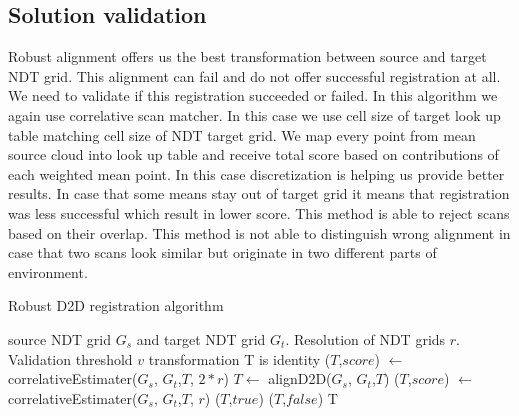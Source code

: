 \subsection{Solution validation}
Robust alignment offers us the best transformation between source and target \gls{NDT} grid. This alignment can fail and do not offer successful registration at all. We need to validate if this registration succeeded or failed. In this algorithm we again use correlative scan matcher. In this case we use cell size of target look up table matching cell size of \gls{NDT} target grid. We map every point from mean source cloud into look up table and receive total score based on contributions of each weighted mean point. In this case discretization is helping us provide better results. In case that some means stay out of target grid it means that registration was less successful which result in lower score. This method is able to reject scans based on their overlap. This method is not able to distinguish wrong alignment in case that two scans look similar but originate in two different parts of environment.

\begin{algorithm}
\label{alg:robust_d2d}
    \caption{Robust \gls{D2D} registration algorithm}
\begin{algorithmic}[1]
\Require source \gls{NDT} grid $G_{s}$ and target \gls{NDT} grid $G_{t}$. Resolution of \gls{NDT} grids $r$. Validation threshold $v$
 \State transformation T is identity
 \State ($T$,$score$) $\gets$ correlativeEstimater($G_{s}$, $G_{t}$,$T$, $2*r$)
 \State $T \gets$ alignD2D($G_{s}$, $G_{t}$,$T$)
 \State ($T$,$score$) $\gets$ correlativeEstimater($G_{s}$, $G_{t}$,$T$, $r$)
	 \State \Return ($T$,$true$) 
 \Else
	 \State \Return ($T$,$false$)
 \EndIf
 \State \Return T 
 \EndFunction
\end{algorithmic}
\end{algorithm}

